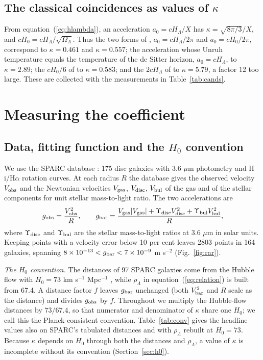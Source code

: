 \documentclass[fleqn,usenatbib]{mnras}
\begin{document}
\subsection{The classical coincidences as values of $\kappa$}
\label{sec:cands}
From equation~(\ref{eq:hlambda}), an acceleration $a_0=cH_\Lambda/X$ has $\kappa=\sqrt{8\pi/3}/X$, and $cH_0=cH_\Lambda/\sqrt{\Omega_\Lambda}$. Thus the two forms of \citet{Milgrom2020}, $a_0=cH_\Lambda/2\pi$ and $a_0=cH_0/2\pi$, correspond to $\kappa=0.461$ and $\kappa=0.557$; the acceleration whose Unruh temperature equals the temperature of the de Sitter horizon, $a_0=cH_\Lambda$, to $\kappa=2.89$; the $cH_0/6$ of \citet{Verlinde2017} to $\kappa=0.583$; and the $2cH_\Lambda$ of \citet{Milgrom1999} to $\kappa=5.79$, a factor 12 too large. These are collected with the measurements in Table~\ref{tab:cands}.

\section{Measuring the coefficient}
\label{sec:kappa}
\subsection{Data, fitting function and the $H_0$ convention}
\label{sec:data}
We use the SPARC database \citep{Lelli2016}: 175 disc galaxies with 3.6 $\mu$m photometry and H\,{\sc i}/H$\alpha$ rotation curves. At each radius $R$ the database gives the observed velocity $V_{\rm obs}$ and the Newtonian velocities $V_{\rm gas}$, $V_{\rm disc}$, $V_{\rm bul}$ of the gas and of the stellar components for unit stellar mass-to-light ratio. The two accelerations are
\begin{equation}
g_{\rm obs}=\frac{V_{\rm obs}^2}{R},\qquad
g_{\rm bar}=\frac{V_{\rm gas}|V_{\rm gas}|+\Upsilon_{\rm disc}V_{\rm disc}^2+\Upsilon_{\rm bul}V_{\rm bul}^2}{R},
\label{eq:gdef}
\end{equation}
where $\Upsilon_{\rm disc}$ and $\Upsilon_{\rm bul}$ are the stellar mass-to-light ratios at 3.6 $\mu$m in solar units. Keeping points with a velocity error below 10 per cent leaves 2803 points in 164 galaxies, spanning $8\times10^{-13}<g_{\rm bar}<7\times10^{-9}$ m s$^{-2}$ (Fig.~\ref{fig:rar}).

\emph{The $H_0$ convention.} The distances of 97 SPARC galaxies come from the Hubble flow with $H_0=73$ km s$^{-1}$ Mpc$^{-1}$ \citep{Lelli2016}, while $\rho_\Lambda$ in equation~(\ref{eq:relation}) is built from 67.4. A distance factor $f$ leaves $g_{\rm bar}$ unchanged (both $V_{\rm bar}^2$ and $R$ scale as the distance) and divides $g_{\rm obs}$ by $f$. Throughout we multiply the Hubble-flow distances by $73/67.4$, so that numerator and denominator of $\kappa$ share one $H_0$; we call this the Planck-consistent convention. Table~\ref{tab:conv} gives the headline values also on SPARC's tabulated distances and with $\rho_\Lambda$ rebuilt at $H_0=73$. Because $\kappa$ depends on $H_0$ through both the distances and $\rho_\Lambda$, a value of $\kappa$ is incomplete without its convention (Section~\ref{sec:h0}).
\end{document}
